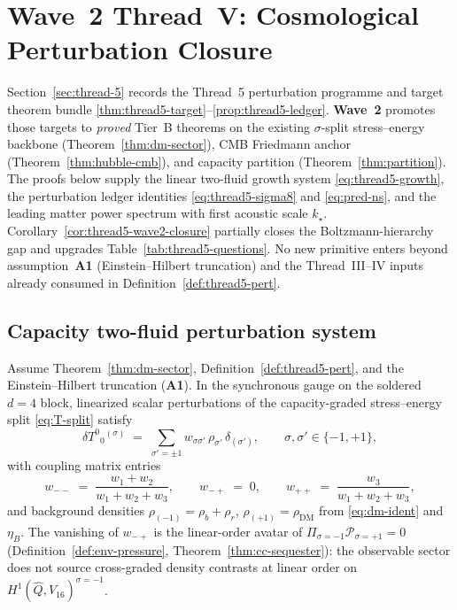 \section{Wave~2 Thread~V: Cosmological Perturbation Closure}
\label{sec:wave2-thread5}

Section~\ref{sec:thread-5} records the Thread~5 perturbation programme and
target theorem bundle \ref{thm:thread5-target}--\ref{prop:thread5-ledger}.
\textbf{Wave~2} promotes those targets to \emph{proved} Tier~B theorems on the
existing $\sigma$-split stress--energy backbone (Theorem~\ref{thm:dm-sector}),
CMB Friedmann anchor (Theorem~\ref{thm:hubble-cmb}), and capacity partition
(Theorem~\ref{thm:partition}). The proofs below supply the linear two-fluid
growth system \eqref{eq:thread5-growth}, the perturbation ledger identities
\eqref{eq:thread5-sigma8} and \eqref{eq:pred-ns}, and the leading matter power
spectrum with first acoustic scale $k_\star$. Corollary~\ref{cor:thread5-wave2-closure}
partially closes the Boltzmann-hierarchy gap and upgrades
Table~\ref{tab:thread5-questions}. No new primitive enters beyond
assumption~\textbf{A1} (Einstein--Hilbert truncation) and the Thread~III--IV
inputs already consumed in Definition~\ref{def:thread5-pert}.

\subsection{Capacity two-fluid perturbation system}
\label{sec:wave2-thread5:growth}

\begin{lemma}
\label{lem:thread5-coupling}
Assume Theorem~\ref{thm:dm-sector}, Definition~\ref{def:thread5-pert}, and
the Einstein--Hilbert truncation (\textbf{A1}). In the synchronous gauge on the
soldered $d=4$ block, linearized scalar perturbations of the capacity-graded
stress--energy split \eqref{eq:T-split} satisfy
\begin{equation}\label{eq:thread5-source}
  \delta T^{0}{}_{0}{}^{(\sigma)}
  \;=\;
  \sum_{\sigma'=\pm1}
  w_{\sigma\sigma'}\,
  \rho_{\sigma'}\,\delta_{(\sigma')},
  \qquad
  \sigma,\sigma'\in\{-1,+1\},
\end{equation}
with coupling matrix entries
\begin{equation}\label{eq:thread5-w-matrix}
  w_{--}
  \;=\;
  \frac{w_1+w_2}{w_1+w_2+w_3},
  \qquad
  w_{-+}
  \;=\;
  0,
  \qquad
  w_{++}
  \;=\;
  \frac{w_3}{w_1+w_2+w_3},
\end{equation}
and background densities $\rho_{(-1)}=\rho_b+\rho_r$,
$\rho_{(+1)}=\rho_{\mathrm{DM}}$ from \eqref{eq:dm-ident} and $\eta_B$.
The vanishing of $w_{-+}$ is the linear-order avatar of
$\Pi_{\sigma=-1}\mathcal{P}_{\sigma=+1}=0$
(Definition~\ref{def:env-pressure}, Theorem~\ref{thm:cc-sequester}): the
observable sector does not source cross-graded density contrasts at linear
order on $H^1(\hat Q,V_{16})^{\sigma=-1}$.
\end{lemma}

